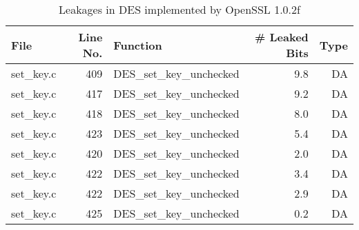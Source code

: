 \begin{table}[h!]
\centering\tiny\scriptsize
\caption{Leakages in DES implemented by OpenSSL 1.0.2f}\label{tab:DESOpenSSL1.0.2f}
\begin{tabular}{lrlrr}
\hline
\textbf{File} & \textbf{Line No.} & \textbf{Function} & \textbf{\# Leaked Bits} & \textbf{Type} \\\hline
set\_key.c& 409&DES\_set\_key\_unchecked&9.8 &DA\\
set\_key.c& 417&DES\_set\_key\_unchecked&9.2 &DA\\
set\_key.c& 418&DES\_set\_key\_unchecked&8.0 &DA\\
set\_key.c& 423&DES\_set\_key\_unchecked&5.4 &DA\\
set\_key.c& 420&DES\_set\_key\_unchecked&2.0 &DA\\
set\_key.c& 422&DES\_set\_key\_unchecked&3.4 &DA\\
set\_key.c& 422&DES\_set\_key\_unchecked&2.9 &DA\\
set\_key.c& 425&DES\_set\_key\_unchecked&0.2 &DA\\
\hline
\end{tabular}
\renewcommand{\baselinestretch}{1.0}\selectfont
\end{table}
